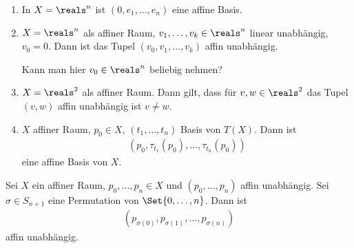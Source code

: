 \begin{beispiele*}
    \begin{enumerate}
        \item In \( X=\reals^n \) ist \( (0,e_1,\dotsc, e_n) \) eine affine Basis.
        \item \( X=\reals^n \) als affiner Raum, \( v_1,\dotsc, v_k\in \reals^n \) linear unabhängig, \( v_0=0 \). Dann ist das Tupel \( (v_0,v_1,\dotsc,v_k) \) affin unabhängig.
        \begin{frage*}
            Kann man hier \( v_0\in \reals^n \) beliebig nehmen?
        \end{frage*}
        \item \( X=\reals^2 \) als affiner Raum. Dann gilt, dass für \( v,w\in \reals^2 \) das Tupel \( (v,w) \) affin unabhängig ist \gdw \( v\neq w \).
        \item \( X \) affiner Raum, \( p_0\in X \), \( (t_1,\dotsc,t_n) \) Basis von \( T(X) \). Dann ist
        \begin{align*}
            (p_0,\tau_{t_1}(p_0),\dotsc, \tau_{t_n}(p_0))
        \end{align*}
        eine affine Basis von \( X \).
    \end{enumerate}
    
\end{beispiele*}
\begin{lemma}
    Sei \( X \) ein affiner Raum, \( p_0,\dotsc, p_n\in X \) und \( (p_0,\dotsc, p_n) \) affin unabhängig. Sei \( \sigma\in S_{n+1} \) eine Permutation von \( \Set{0,\dotsc,n} \). Dann ist
    \begin{align*}
        (p_{\sigma(0)},p_{\sigma(1)},\dotsc,p_{\sigma(n)})
    \end{align*}
    affin unabhängig.
\end{lemma}
